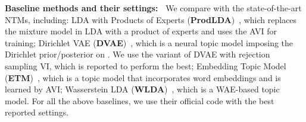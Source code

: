 \documentclass{article}
\begin{document}
\textbf{Baseline methods and their settings:~}
We compare with the state-of-the-art NTMs, including:
LDA with Products of Experts (\textbf{ProdLDA})~\citep{srivastava2017autoencoding}, which replaces the mixture model in LDA with a product of experts and uses the AVI for training;
Dirichlet VAE (\textbf{DVAE})~\citep{burkhardt2019decoupling}, which is a neural topic model imposing the Dirichlet prior/posterior on . We use the variant of DVAE with rejection sampling VI, which is reported to perform the best;
Embedding Topic Model (\textbf{ETM})~\citep{dieng2019topic}, which is a topic model that incorporates word embeddings and is learned by AVI;
Wasserstein LDA (\textbf{WLDA})~\citep{nan2019topic}, which is a WAE-based topic model.
For all the above baselines, we use their official code with the best reported settings.
\end{document}
